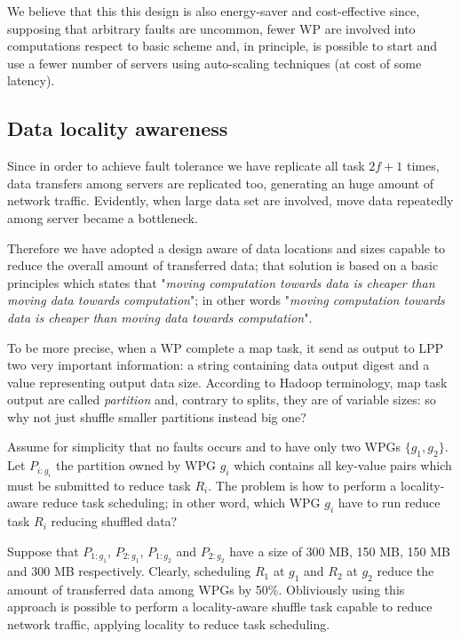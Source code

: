 \documentclass[sigchi]{acmart}
\begin{document}
We believe that this this design is also energy-saver and cost-effective since, supposing that arbitrary faults are uncommon, fewer WP are involved into computations respect to basic scheme and, in principle, is possible to start and use a fewer number of servers using auto-scaling techniques (at cost of some latency).

\subsection{Data locality awareness}

Since in order to achieve fault tolerance we have replicate all task $2f + 1$ times, data transfers among servers are replicated too, generating an huge amount of network traffic. Evidently, when large data set are involved, move data repeatedly among server became a bottleneck.

Therefore we have adopted a design aware of data locations and sizes capable to reduce the overall amount of transferred data; that solution is based on a basic principles which states that "\textit{moving computation towards data is cheaper than moving data towards computation}"; in other words  "\textit{moving computation towards data is cheaper than moving data towards computation}".

To be more precise, when a WP complete a map task, it send as output to LPP two very important information: a string containing data output digest and a value representing output data size. According to Hadoop terminology, map task output are called \textit{partition} and, contrary to splits, they are of variable sizes: so why not just shuffle smaller partitions instead big one? 

Assume for simplicity that no faults occurs and to have only two WPGs $\lbrace g_1, g_2 \rbrace$. Let $P_{i:g_i}$ the partition owned by WPG $g_i$ which contains all key-value pairs which must be submitted to reduce task $R_i$. The problem is how to perform a locality-aware reduce task scheduling; in other word, which WPG $g_i$ have to run reduce task $R_i$ reducing shuffled data?

Suppose that $P_{1:g_1}$, $P_{2:g_1}$, $P_{1:g_2}$ and $P_{2:g_2}$ have a size of 300 MB, 150 MB, 150 MB and 300 MB respectively. Clearly, scheduling $R_1$ at $g_1$ and $R_2$ at $g_2$ reduce the amount of transferred data among WPGs by 50\%. Obliviously using this approach is possible to perform a locality-aware shuffle task capable to reduce network traffic, applying locality to reduce task scheduling.  
\end{document}
